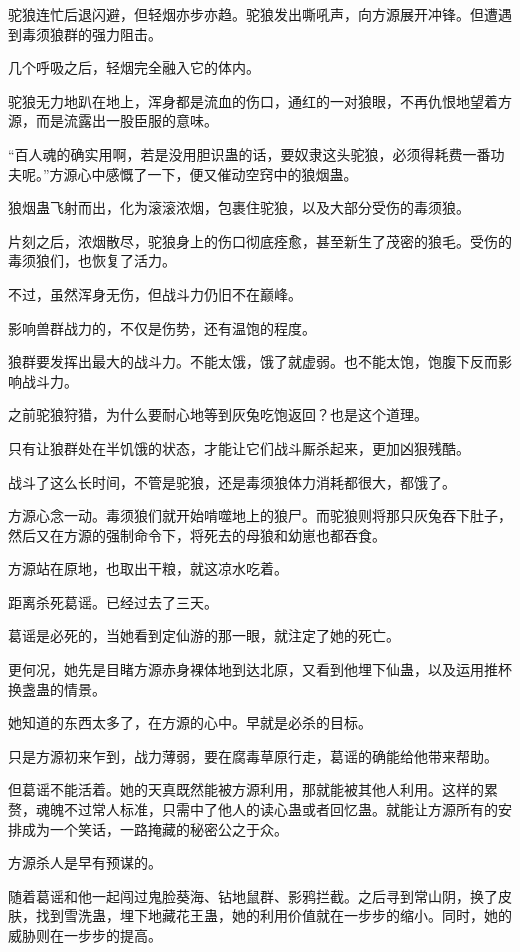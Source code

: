 \begin{this_body}
驼狼连忙后退闪避，但轻烟亦步亦趋。驼狼发出嘶吼声，向方源展开冲锋。但遭遇到毒须狼群的强力阻击。

几个呼吸之后，轻烟完全融入它的体内。

驼狼无力地趴在地上，浑身都是流血的伤口，通红的一对狼眼，不再仇恨地望着方源，而是流露出一股臣服的意味。

“百人魂的确实用啊，若是没用胆识蛊的话，要奴隶这头驼狼，必须得耗费一番功夫呢。”方源心中感慨了一下，便又催动空窍中的狼烟蛊。

狼烟蛊飞射而出，化为滚滚浓烟，包裹住驼狼，以及大部分受伤的毒须狼。

片刻之后，浓烟散尽，驼狼身上的伤口彻底痊愈，甚至新生了茂密的狼毛。受伤的毒须狼们，也恢复了活力。

不过，虽然浑身无伤，但战斗力仍旧不在巅峰。

影响兽群战力的，不仅是伤势，还有温饱的程度。

狼群要发挥出最大的战斗力。不能太饿，饿了就虚弱。也不能太饱，饱腹下反而影响战斗力。

之前驼狼狩猎，为什么要耐心地等到灰兔吃饱返回？也是这个道理。

只有让狼群处在半饥饿的状态，才能让它们战斗厮杀起来，更加凶狠残酷。

战斗了这么长时间，不管是驼狼，还是毒须狼体力消耗都很大，都饿了。

方源心念一动。毒须狼们就开始啃噬地上的狼尸。而驼狼则将那只灰兔吞下肚子，然后又在方源的强制命令下，将死去的母狼和幼崽也都吞食。

方源站在原地，也取出干粮，就这凉水吃着。

距离杀死葛谣。已经过去了三天。

葛谣是必死的，当她看到定仙游的那一眼，就注定了她的死亡。

更何况，她先是目睹方源赤身裸体地到达北原，又看到他埋下仙蛊，以及运用推杯换盏蛊的情景。

她知道的东西太多了，在方源的心中。早就是必杀的目标。

只是方源初来乍到，战力薄弱，要在腐毒草原行走，葛谣的确能给他带来帮助。

但葛谣不能活着。她的天真既然能被方源利用，那就能被其他人利用。这样的累赘，魂魄不过常人标准，只需中了他人的读心蛊或者回忆蛊。就能让方源所有的安排成为一个笑话，一路掩藏的秘密公之于众。

方源杀人是早有预谋的。

随着葛谣和他一起闯过鬼脸葵海、钻地鼠群、影鸦拦截。之后寻到常山阴，换了皮肤，找到雪洗蛊，埋下地藏花王蛊，她的利用价值就在一步步的缩小。同时，她的威胁则在一步步的提高。


\end{this_body}
